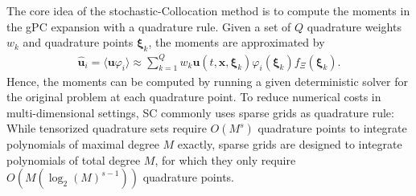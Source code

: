 The core idea of the stochastic-Collocation method is to compute the moments in the gPC expansion with a quadrature rule. Given a set of $Q$ quadrature weights $w_k$ and quadrature points $\bm{\xi}_k$, the moments are approximated by
\begin{align*}
\bm{\hat u}_i = \langle \bm{u}\varphi_i \rangle \approx \sum_{k = 1}^{Q}w_k \bm{u}({t,\bm{x},\bm{\xi}_k})\varphi_i(\bm{\xi}_k)f_{\Xi}(\bm{\xi}_k).
\end{align*} 
Hence, the moments can be computed by running a given deterministic solver for the original problem at each quadrature point. To reduce numerical costs in multi-dimensional settings, SC commonly uses sparse grids as quadrature rule: While tensorized quadrature sets require $O(M^s)$ quadrature points to integrate polynomials of maximal degree $M$ exactly, sparse grids are designed to integrate polynomials of total degree $M$, for which they only require $O(M(\log_2(M)^{s-1}))$ quadrature points. 

